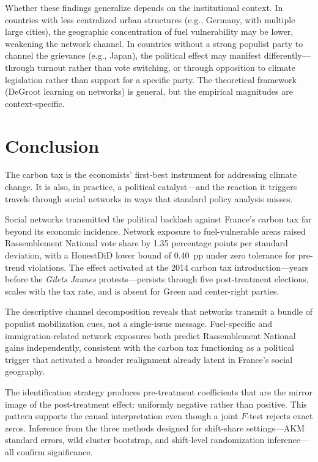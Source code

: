\documentclass[12pt]{article}
\newcommand{\rn}{Rassemblement National}
\newcommand{\gj}{\textit{Gilets Jaunes}}
\begin{document}
Whether these findings generalize depends on the institutional context. In countries with less centralized urban structures (e.g., Germany, with multiple large cities), the geographic concentration of fuel vulnerability may be lower, weakening the network channel. In countries without a strong populist party to channel the grievance (e.g., Japan), the political effect may manifest differently---through turnout rather than vote switching, or through opposition to climate legislation rather than support for a specific party. The theoretical framework (DeGroot learning on networks) is general, but the empirical magnitudes are context-specific.



\section{Conclusion}
\label{sec:conclusion}

The carbon tax is the economists' first-best instrument for addressing climate change. It is also, in practice, a political catalyst---and the reaction it triggers travels through social networks in ways that standard policy analysis misses.

Social networks transmitted the political backlash against France's carbon tax far beyond its economic incidence. Network exposure to fuel-vulnerable areas raised \rn{} vote share by 1.35 percentage points per standard deviation, with a HonestDiD lower bound of 0.40~pp under zero tolerance for pre-trend violations. The effect activated at the 2014 carbon tax introduction---years before the \gj{} protests---persists through five post-treatment elections, scales with the tax rate, and is absent for Green and center-right parties.

The descriptive channel decomposition reveals that networks transmit a bundle of populist mobilization cues, not a single-issue message. Fuel-specific and immigration-related network exposures both predict \rn{} gains independently, consistent with the carbon tax functioning as a political trigger that activated a broader realignment already latent in France's social geography.

The identification strategy produces pre-treatment coefficients that are the mirror image of the post-treatment effect: uniformly negative rather than positive. This pattern supports the causal interpretation even though a joint $F$-test rejects exact zeros. Inference from the three methods designed for shift-share settings---AKM standard errors, wild cluster bootstrap, and shift-level randomization inference---all confirm significance.
\end{document}
